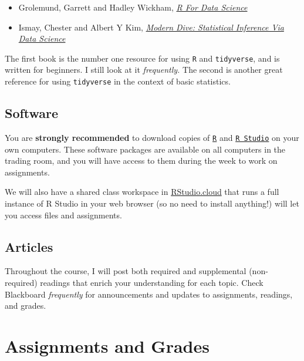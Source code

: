 \documentclass{article}
\providecommand{\tightlist}{%
  \setlength{\itemsep}{0pt}\setlength{\parskip}{0pt}}
\begin{document}
\begin{itemize}
\tightlist
\item
  Grolemund, Garrett and Hadley Wickham,
  \href{https://r4ds.had.co.nz/}{\emph{R For Data Science}}
\item
  Ismay, Chester and Albert Y Kim,
  \href{https://moderndive.com/}{\emph{Modern Dive: Statistical
  Inference Via Data Science}}
\end{itemize}

The first book is the number one resource for using \texttt{R} and
\texttt{tidyverse}, and is written for beginners. I still look at it
\emph{frequently.} The second is another great reference for using
\texttt{tidyverse} in the context of basic statistics.

\hypertarget{software}{%
\subsection*{Software}\label{software}}

You are \textbf{strongly recommended} to download copies of
\href{https://www.r-project.org/}{\texttt{R}} and
\href{http://www.rstudio.com}{\texttt{R\ Studio}} on your own computers.
These software packages are available on all computers in the trading
room, and you will have access to them during the week to work on
assignments.

We will also have a shared class workspace in
\href{http://rstudio.cloud/}{RStudio.cloud} that runs a full instance of
R Studio in your web browser (so no need to install anything!) will let
you access files and assignments.

\hypertarget{articles}{%
\subsection*{Articles}\label{articles}}

Throughout the course, I will post both required and supplemental
(non-required) readings that enrich your understanding for each topic.
Check Blackboard \emph{frequently} for announcements and updates to
assignments, readings, and grades.

\hypertarget{assignments-and-grades}{%
\section*{Assignments and Grades}\label{assignments-and-grades}}
\end{document}
